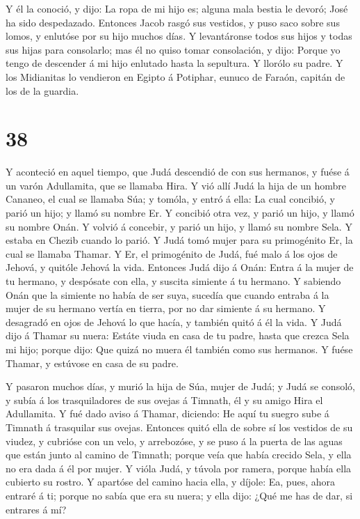  Y él la conoció, y dijo: La ropa de mi hijo es; alguna
mala bestia le devoró; José ha sido despedazado.  Entonces
Jacob rasgó sus vestidos, y puso saco sobre sus lomos, y enlutóse por su
hijo muchos días.  Y levantáronse todos sus hijos y todas
sus hijas para consolarlo; mas él no quiso tomar consolación, y dijo:
Porque yo tengo de descender á mi hijo enlutado hasta la sepultura. Y
llorólo su padre.  Y los Midianitas lo vendieron en Egipto
á Potiphar, eunuco de Faraón, capitán de los de la guardia.

\hypertarget{section-37}{%
\section{38}\label{section-37}}

 Y aconteció en aquel tiempo, que Judá descendió de con sus
hermanos, y fuése á un varón Adullamita, que se llamaba Hira.
 Y vió allí Judá la hija de un hombre Cananeo, el cual se
llamaba Súa; y tomóla, y entró á ella:  La cual concibió, y
parió un hijo; y llamó su nombre Er.  Y concibió otra vez, y
parió un hijo, y llamó su nombre Onán.  Y volvió á concebir,
y parió un hijo, y llamó su nombre Sela. Y estaba en Chezib cuando lo
parió.  Y Judá tomó mujer para su primogénito Er, la cual se
llamaba Thamar.  Y Er, el primogénito de Judá, fué malo á
los ojos de Jehová, y quitóle Jehová la vida.  Entonces Judá
dijo á Onán: Entra á la mujer de tu hermano, y despósate con ella, y
suscita simiente á tu hermano.  Y sabiendo Onán que la
simiente no había de ser suya, sucedía que cuando entraba á la mujer de
su hermano vertía en tierra, por no dar simiente á su hermano.
 Y desagradó en ojos de Jehová lo que hacía, y también
quitó á él la vida.  Y Judá dijo á Thamar su nuera: Estáte
viuda en casa de tu padre, hasta que crezca Sela mi hijo; porque dijo:
Que quizá no muera él también como sus hermanos. Y fuése Thamar, y
estúvose en casa de su padre.

 Y pasaron muchos días, y murió la hija de Súa, mujer de
Judá; y Judá se consoló, y subía á los trasquiladores de sus ovejas á
Timnath, él y su amigo Hira el Adullamita.  Y fué dado
aviso á Thamar, diciendo: He aquí tu suegro sube á Timnath á trasquilar
sus ovejas.  Entonces quitó ella de sobre sí los vestidos
de su viudez, y cubrióse con un velo, y arrebozóse, y se puso á la
puerta de las aguas que están junto al camino de Timnath; porque veía
que había crecido Sela, y ella no era dada á él por mujer. 
Y vióla Judá, y túvola por ramera, porque había ella cubierto su rostro.
 Y apartóse del camino hacia ella, y díjole: Ea, pues,
ahora entraré á ti; porque no sabía que era su nuera; y ella dijo: ¿Qué
me has de dar, si entrares á mí?

